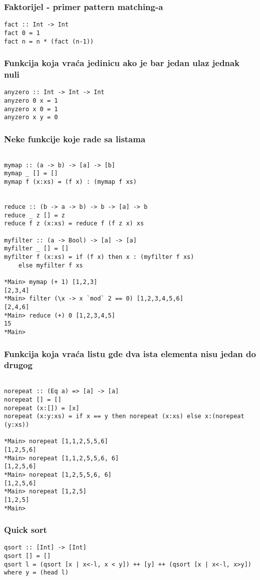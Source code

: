 \documentclass{beamer}
\begin{document}
\begin{frame}[fragile]
\frametitle{Faktorijel - primer pattern matching-a} 
\begin{lstlisting}
fact :: Int -> Int
fact 0 = 1
fact n = n * (fact (n-1))
\end{lstlisting}
\end{frame}

\begin{frame}[fragile]
\frametitle{Funkcija koja vraća jedinicu ako je bar jedan ulaz jednak nuli}
\begin{lstlisting}
anyzero :: Int -> Int -> Int
anyzero 0 x = 1
anyzero x 0 = 1
anyzero x y = 0
\end{lstlisting}
\end{frame}


\begin{frame}[fragile]
\frametitle{Neke funkcije koje rade sa listama}
\begin{lstlisting}

mymap :: (a -> b) -> [a] -> [b]
mymap _ [] = []
mymap f (x:xs) = (f x) : (mymap f xs)


reduce :: (b -> a -> b) -> b -> [a] -> b 
reduce _ z [] = z 
reduce f z (x:xs) = reduce f (f z x) xs

myfilter :: (a -> Bool) -> [a] -> [a]
myfilter _ [] = [] 
myfilter f (x:xs) = if (f x) then x : (myfilter f xs) 
	else myfilter f xs

*Main> mymap (+ 1) [1,2,3]
[2,3,4]
*Main> filter (\x -> x `mod` 2 == 0) [1,2,3,4,5,6]
[2,4,6]
*Main> reduce (+) 0 [1,2,3,4,5]
15
*Main> 

\end{lstlisting}
\end{frame}

\begin{frame}[fragile]
\frametitle{Funkcija koja vraća listu gde dva ista elementa nisu jedan do drugog} 
\begin{lstlisting}

norepeat :: (Eq a) => [a] -> [a]
norepeat [] = [] 
norepeat (x:[]) = [x]
norepeat (x:y:xs) = if x == y then norepeat (x:xs) else x:(norepeat (y:xs))

*Main> norepeat [1,1,2,5,5,6]
[1,2,5,6]
*Main> norepeat [1,1,2,5,5,6, 6]
[1,2,5,6]
*Main> norepeat [1,2,5,5,6, 6]
[1,2,5,6]
*Main> norepeat [1,2,5]
[1,2,5]
*Main>

\end{lstlisting}
\end{frame}


\begin{frame}[fragile]
\frametitle{Quick sort}
\begin{lstlisting}
qsort :: [Int] -> [Int]
qsort [] = []
qsort l = (qsort [x | x<-l, x < y]) ++ [y] ++ (qsort [x | x<-l, x>y]) where y = (head l)
\end{lstlisting}
\end{frame}
\end{document}
